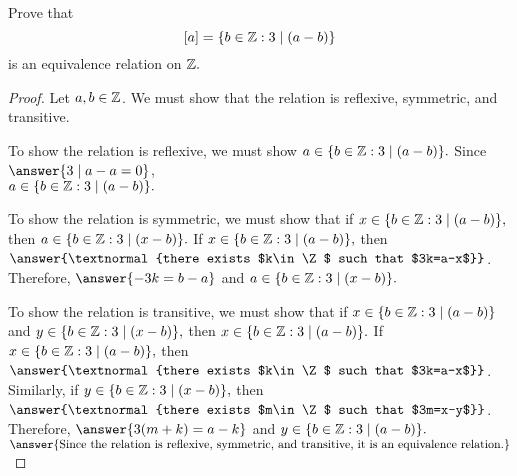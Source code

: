 \documentclass{ximera}
\begin{document}
\begin{br}
    Prove that \[[a]=\{b\in\mathbb Z: 3\mid(a-b)\}\] is an equivalence relation on $\mathbb Z.$
  \end{br}
  
  \begin{proof}
    Let $a,b\in\mathbb Z$. We must show that the relation is reflexive, symmetric, and transitive.
  
     To show the relation is reflexive, we must show $a\in \{b\in\mathbb Z: 3\mid(a-b)\}.$ Since $\answer{3\mid a-a=0}$,\\
     $a\in \{b\in\mathbb Z: 3\mid(a-b)\}.$
  
     To show the relation is symmetric, we must show that if $x\in \{b\in\mathbb Z: 3\mid(a-b)\},$ then $a\in \{b\in\mathbb Z: 3\mid(x-b)\}.$ If $x\in \{b\in\mathbb Z: 3\mid(a-b)\},$ then $\answer{\textnormal{there exists $k\in\Z$ such that $3k=a-x$}}$. Therefore, $\answer{-3k=b-a}$
     and $a\in \{b\in\mathbb Z: 3\mid(x-b)\}.$
  
     To show the relation is transitive, we must show that if $x\in \{b\in\mathbb Z: 3\mid(a-b)\}$ and $y\in \{b\in\mathbb Z: 3\mid(x-b)\},$ then $x\in \{b\in\mathbb Z: 3\mid(a-b)\}.$ If $x\in \{b\in\mathbb Z: 3\mid(a-b)\},$ then $\answer{\textnormal{there exists $k\in\Z$ such that $3k=a-x$}}$. 
     Similarly, if $y\in \{b\in\mathbb Z: 3\mid(x-b)\},$ then $\answer{\textnormal{there exists $m\in\Z$ such that $3m=x-y$}}$.
     Therefore, $\answer{3(m+k)=a-k}$
     and $y\in \{b\in\mathbb Z: 3\mid(a-b)\}.$ $\answer{\textnormal{Since the relation is reflexive, symmetric, and transitive, it is an equivalence relation.}}$
  \end{proof}

\end{document}
